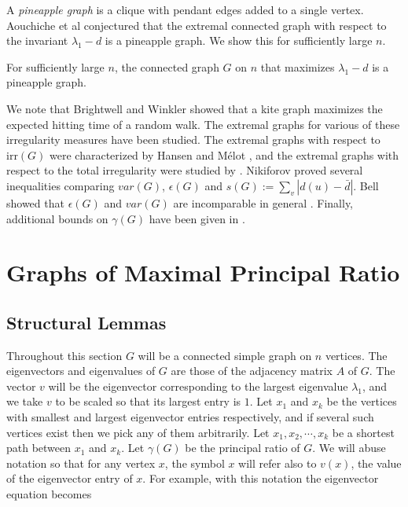 A \textit{pineapple graph} is a clique with pendant edges added to a single vertex.
Aouchiche et al \cite{AouchicheEtAl2008} conjectured that the extremal connected
graph with respect to the invariant $\lambda_1 - d$ is a pineapple graph.  We
show this for sufficiently large $n$.
\begin{theorem}\label{main_theorem}
  For sufficiently large $n$, the connected graph $G$ on $n$
  that maximizes $\lambda_1 - d$ is a pineapple graph.
\end{theorem}



We note that Brightwell and Winkler \cite{BrightwellWinkler1990} showed that
a kite graph maximizes the expected hitting time of a random walk.
The extremal graphs for various of these irregularity measures have been
studied.
The extremal graphs with respect to $\textrm{irr}(G)$
were characterized by Hansen and M\'elot \cite{HansenMelot2002},
and the extremal graphs with respect to the total irregularity
were studied by \cite{Abdo2014}.
Nikiforov \cite{Nikiforov2006} proved several inequalities comparing
$var(G)$, $\epsilon(G)$ and $s(G) := \sum_v |d(u) - \bar{d}|$.  
Bell showed that $\epsilon(G)$ and $var(G)$ are incomparable in general
\cite{Bell1992}.  Finally, additional bounds on $\gamma(G)$ have been given in
\cite{CioabaGregory2007, PapendieckRecht2000, Minc1970, Latham1995, Zhang2005}.


\section{Graphs of Maximal Principal Ratio}

\subsection{Structural Lemmas}

Throughout this section $G$ will be a connected simple graph on $n$ vertices.
The eigenvectors and eigenvalues of $G$ are those of the adjacency
matrix $A$ of $G$.  The vector $v$ will be the eigenvector corresponding
to the largest eigenvalue $\lambda_1$,  and we take $v$ to be scaled
so that its largest entry is $1$.  Let $x_1$ and $x_k$
be the vertices with smallest and largest eigenvector entries respectively, and
if several such vertices exist then we pick any of them arbitrarily.
Let $x_1, x_2, \cdots, x_k$ be a shortest path between $x_1$ and
$x_k$.  Let $\gamma(G)$ be the principal ratio of $G$.  We will abuse
notation so that for any vertex $x$, the symbol $x$ will refer also to $v(x)$,
the value of the eigenvector entry of $x$.  For example, with this notation
the eigenvector equation becomes

